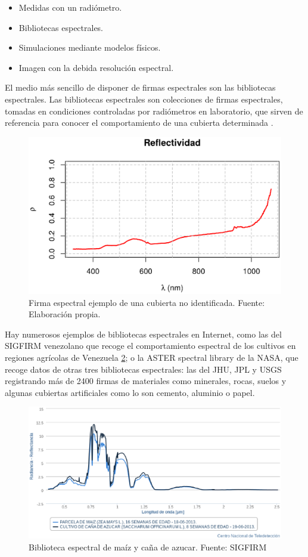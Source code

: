 \begin{itemize}
	\item Medidas con un radiómetro.
	\item Bibliotecas espectrales.
	\item Simulaciones mediante modelos físicos.
	\item Imagen con la debida resolución espectral.
\end{itemize}

El medio más sencillo de disponer de firmas espectrales son las bibliotecas espectrales. Las bibliotecas espectrales son colecciones de firmas espectrales, tomadas en condiciones controladas por radiómetros en laboratorio, que sirven de referencia para conocer el comportamiento de una cubierta determinada \citep{andino2011}.

\begin{figure}
	\centering	
	\includegraphics[width=0.7\linewidth]{./Imagenes/Firma_espectral.eps}
	\caption[Firma espectral ejemplo]{Firma espectral ejemplo de una cubierta no identificada. Fuente: Elaboración propia.}
	\label{fig:firma}
\end{figure}

Hay numerosos ejemplos de bibliotecas espectrales en Internet, como las del \ac{SIGFIRM} venezolano que recoge el comportamiento espectral de los cultivos en regiones agrícolas de Venezuela \ref{fig:biblioteca_esp}; o la ASTER spectral library de la NASA, que recoge datos de otras tres bibliotecas espectrales: las del \ac{JHU}, \ac{JPL} y \ac{USGS} registrando más de 2400 firmas de materiales como minerales, rocas, suelos y algunas cubiertas artificiales como lo son cemento, aluminio o papel.\Sep

\begin{figure}
	\centering
	\includegraphics[width=0.7\linewidth]{./Imagenes/biblioteca_espectral_SIGFIRM.eps}
	\caption[Biblioteca espectral SIGFIRM]{Biblioteca espectral de maíz y caña de azucar. Fuente: \ac{SIGFIRM}}
	\label{fig:biblioteca_esp}
\end{figure}

